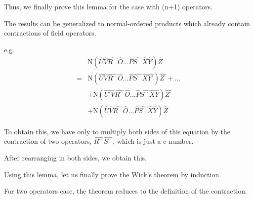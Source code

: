 Thus, we finally prove this lemma for the case with (n+1) operators.

The results can be generalized to normal-ordered products which already contain contractions of field operators.

e.g.
\begin{align}
&\mathrm{N}(\hat{U}\hat{V}\hat{R^{\cdot\cdot}}\hat{O}...\hat{P}\hat{S^{\cdot\cdot}}\hat{X}\hat{Y})\hat{Z} \nonumber \\
=&\mathrm{N}(\hat{U}\hat{V}\hat{R^{\cdot\cdot}}\hat{O}...\hat{P}\hat{S^{\cdot\cdot}}\hat{X}\hat{Y^{\cdot}})\hat{Z^{\cdot}}+... \nonumber \\
&+\mathrm{N}(\hat{U^{\cdot}}\hat{V}\hat{R^{\cdot\cdot}}\hat{O}...\hat{P}\hat{S^{\cdot\cdot}}\hat{X}\hat{Y})\hat{Z^{\cdot}}\nonumber \\
&+\mathrm{N}(\hat{U}\hat{V}\hat{R^{\cdot\cdot}}\hat{O}...\hat{P}\hat{S^{\cdot\cdot}}\hat{X}\hat{Y})\hat{Z}\nonumber
\end{align}

To obtain this, we have only to multiply both sides of this equation by the contraction of two operators, $\hat{R^{\cdot\cdot}}\hat{S^{\cdot\cdot}}$, which is just a c-number.

After rearranging in both sides, we obtain this.


Using this lemma, let us finally prove the Wick's theorem by induction.

For two operators case, the theorem reduces to the definition of the contraction.

